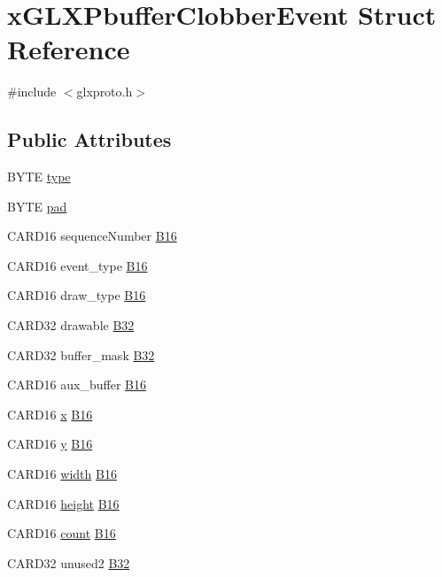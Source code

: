 \hypertarget{structx_g_l_x_pbuffer_clobber_event}{}\section{x\+G\+L\+X\+Pbuffer\+Clobber\+Event Struct Reference}
\label{structx_g_l_x_pbuffer_clobber_event}


{\ttfamily \#include $<$glxproto.\+h$>$}

\subsection*{Public Attributes}
\begin{DoxyCompactItemize}
\item 
B\+Y\+TE \hyperlink{structx_g_l_x_pbuffer_clobber_event_accd165e02c5d2d39c3206d78f7b783be}{type}
\item 
B\+Y\+TE \hyperlink{structx_g_l_x_pbuffer_clobber_event_a59d37b2481d1c10d5695b57ac913c065}{pad}
\item 
C\+A\+R\+D16 sequence\+Number \hyperlink{structx_g_l_x_pbuffer_clobber_event_a0104f0a5fe396aa5f255064203ea3492}{B16}
\item 
C\+A\+R\+D16 event\+\_\+type \hyperlink{structx_g_l_x_pbuffer_clobber_event_a774983ec4f44c8a42fba55fbf6e781ec}{B16}
\item 
C\+A\+R\+D16 draw\+\_\+type \hyperlink{structx_g_l_x_pbuffer_clobber_event_a90006eacf6eeae53a63d8fe589d0ed71}{B16}
\item 
C\+A\+R\+D32 drawable \hyperlink{structx_g_l_x_pbuffer_clobber_event_a73eb59914e038b8d82f182366154f627}{B32}
\item 
C\+A\+R\+D32 buffer\+\_\+mask \hyperlink{structx_g_l_x_pbuffer_clobber_event_add10bd4045bc65f38b0830983c5e67a0}{B32}
\item 
C\+A\+R\+D16 aux\+\_\+buffer \hyperlink{structx_g_l_x_pbuffer_clobber_event_a0de538a37a4b74cf027721c62731e8db}{B16}
\item 
C\+A\+R\+D16 \hyperlink{gl_8h_ad0e63d0edcdbd3d79554076bf309fd47}{x} \hyperlink{structx_g_l_x_pbuffer_clobber_event_a4536423960b86c3f882f59bd98a63ede}{B16}
\item 
C\+A\+R\+D16 \hyperlink{gl_8h_a1675d9d7bb68e1657ff028643b4037e3}{y} \hyperlink{structx_g_l_x_pbuffer_clobber_event_a233a196da4837f388cb2f6feaf935940}{B16}
\item 
C\+A\+R\+D16 \hyperlink{gl_8h_a9a82cf3caff84cabc4598e2619faac17}{width} \hyperlink{structx_g_l_x_pbuffer_clobber_event_a16cd3a3ebd507aad40550b7ca8ac9d58}{B16}
\item 
C\+A\+R\+D16 \hyperlink{gl_8h_aa352f2804b9902ac30769c00dde75d5f}{height} \hyperlink{structx_g_l_x_pbuffer_clobber_event_aae39696635dd89d0b99ce6f77cd62fa4}{B16}
\item 
C\+A\+R\+D16 \hyperlink{gl_8h_a619bc20e8198de3bd3f3d7fc34de66b2}{count} \hyperlink{structx_g_l_x_pbuffer_clobber_event_a8f771653cf1da736411b003bfd5a256c}{B16}
\item 
C\+A\+R\+D32 unused2 \hyperlink{structx_g_l_x_pbuffer_clobber_event_af2327191dd9300b706fc516098be4ee0}{B32}
\end{DoxyCompactItemize}


